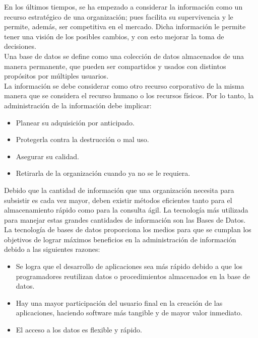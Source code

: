 	En los \'ultimos tiempos, se ha empezado a considerar la informaci\'on como un recurso estrat\'egico de una organizaci\'on; pues facilita su supervivencia y le permite, adem\'as, ser competitiva en el mercado. Dicha informaci\'on le permite tener una visi\'on de los posibles cambios, y con esto mejorar la toma de decisiones.\\

	Una base de datos se define como una colecci\'on de datos almacenados de una manera permanente, que pueden ser compartidos y usados con distintos prop\'ositos por m\'ultiples usuarios.\\

	La informaci\'on se debe considerar como otro recurso corporativo de la misma manera que se considera el recurso humano o los recursos f\'isicos. Por lo tanto, la administraci\'on de la informaci\'on debe implicar:

	\begin{itemize}
		\item Planear su adquisici\'on por anticipado.
		\item Protegerla contra la destrucci\'on o mal uso.
		\item Asegurar su calidad.
		\item Retirarla de la organizaci\'on cuando ya no se le requiera.
	\end{itemize}


	Debido que la cantidad de informaci\'on que una organizaci\'on necesita para subsistir es cada vez mayor, deben existir m\'etodos eficientes tanto para el almacenamiento r\'apido como para la consulta \'agil. La tecnolog\'ia m\'as utilizada para manejar estas grandes cantidades de informaci\'on son las Bases de Datos.\\

	La tecnolog\'ia de bases de datos proporciona los medios para que se cumplan los objetivos de lograr m\'aximos beneficios en la administraci\'on de informaci\'on debido a las siguientes razones:

	\begin{itemize}
		\item Se logra que el desarrollo de aplicaciones sea m\'as r\'apido debido a que los programadores reutilizan datos o procedimientos almacenados en la base de datos.
		\item Hay una mayor participaci\'on del usuario final en la creaci\'on de las aplicaciones, haciendo software m\'as tangible y de mayor valor inmediato.
		\item El acceso a los datos es flexible y r\'apido.
	\end{itemize}


